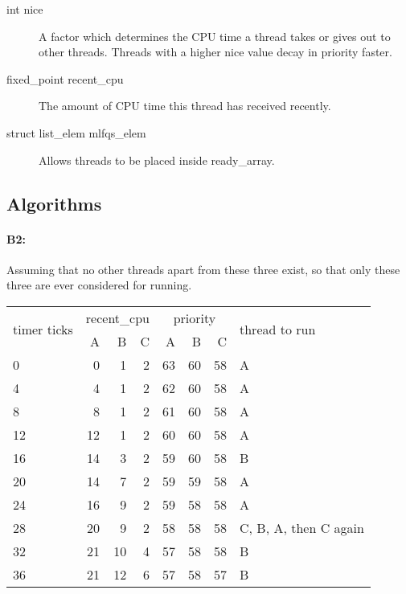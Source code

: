 \begin{description}
  \begin{description}

  \item[int nice] A factor which determines the CPU time a thread takes or gives
    out to other threads. Threads with a higher nice value decay in priority faster.

  \item[fixed\_point recent\_cpu] The amount of CPU time this thread has received
    recently.

  \item[struct list\_elem mlfqs\_elem] Allows threads to be placed inside
    ready\_array.

  \end{description}

\end{description}

\subsection{Algorithms}
\paragraph{B2:} %

Assuming that no other threads apart from these three exist, so that only these
three are ever considered for running.

\begin{tabular}{ | l | r r r | r r r | l | }
  \hline
  \multirow{2}{*}{timer ticks} & \multicolumn{3}{|c|}{recent\_cpu} &
    \multicolumn{3}{|c|}{priority} & \multirow{2}{*}{thread to run} \\
     & A  & B & C & A  & B  & C  &   \\
  \hline
  0  & 0  & 1  & 2 & 63 & 60 & 58 & A                     \\
  4  & 4  & 1  & 2 & 62 & 60 & 58 & A                     \\
  8  & 8  & 1  & 2 & 61 & 60 & 58 & A                     \\
  12 & 12 & 1  & 2 & 60 & 60 & 58 & A \and B              \\
  16 & 14 & 3  & 2 & 59 & 60 & 58 & B                     \\
  20 & 14 & 7  & 2 & 59 & 59 & 58 & A \and B              \\
  24 & 16 & 9  & 2 & 59 & 58 & 58 & A                     \\
  28 & 20 & 9  & 2 & 58 & 58 & 58 & C, B, A, then C again \\
  32 & 21 & 10 & 4 & 57 & 58 & 58 & B \and C              \\
  36 & 21 & 12 & 6 & 57 & 58 & 57 & B                     \\
  \hline
\end{tabular}

